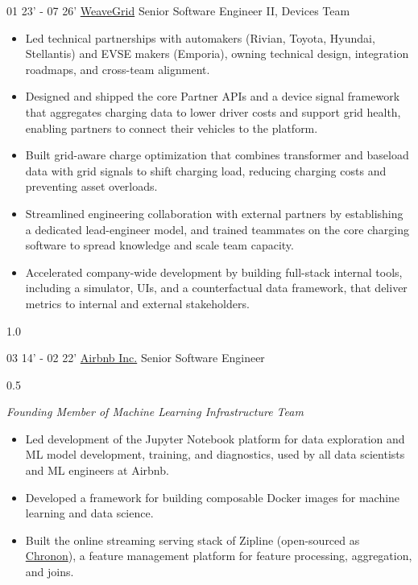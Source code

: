 \documentclass[]{patyoon-cv}
\begin{document}
\begin{entrylist}
\entry
{01 23' - 07 26'}
{\href{https://www.weavegrid.com/}{WeaveGrid}}
{Senior Software Engineer II, Devices Team}
{
\begin{itemize}
\item Led technical partnerships with automakers (Rivian, Toyota, Hyundai, Stellantis) and EVSE makers (Emporia), owning technical design, integration roadmaps, and cross-team alignment.
\item Designed and shipped the core Partner APIs and a device signal framework that aggregates charging data to lower driver costs and support grid health, enabling partners to connect their vehicles to the platform.
\item Built grid-aware charge optimization that combines transformer and baseload data with grid signals to shift charging load, reducing charging costs and preventing asset overloads.
\item Streamlined engineering collaboration with external partners by establishing a dedicated lead-engineer model, and trained teammates on the core charging software to spread knowledge and scale team capacity.
\item Accelerated company-wide development by building full-stack internal tools, including a simulator, UIs, and a counterfactual data framework, that deliver metrics to internal and external stakeholders.
\end{itemize}
\begin{spacing}{1.0} \end{spacing}
}
\entry
{03 14' - 02 22'}
{\href{https://www.airbnb.com/}{Airbnb Inc.}}
{Senior Software Engineer}
{\begin{spacing}{0.5} \end{spacing}
\emph{\small Founding Member of Machine Learning Infrastructure Team}\\
\begin{itemize}
\item Led development of the Jupyter Notebook platform for data exploration and ML model development, training, and diagnostics, used by all data scientists and ML engineers at Airbnb.
\item Developed a framework for building composable Docker images for machine learning and data science.
\item Built the online streaming serving stack of Zipline (open-sourced as \href{https://chronon.ai/}{Chronon}), a feature management platform for feature processing, aggregation, and joins.
\end{itemize}
}
\end{entrylist}
\end{document}
